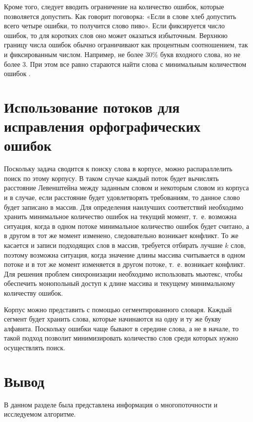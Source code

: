 Кроме того, следует вводить ограничение на количество ошибок, которые позволяется допустить. Как говорит поговорка: «Если в слове хлеб допустить всего четыре ошибки, то получится слово пиво». 
Если фиксируется число ошибок, то для коротких слов оно может оказаться избыточным.
Верхнюю границу числа ошибок обычно ограничивают как процентным соотношением, так и фиксированным числом. 
Например, не более $30\%$ букв входного слова, но не более 3.
При этом все равно стараются найти слова с минимальным количеством ошибок \cite{miem}.

\section{Использование потоков для исправления орфографических ошибок}

Поскольку задача сводится к поиску слова в корпусе, можно распараллелить поиск по этому корпусу. В таком случае каждый поток будет вычислять расстояние Левенштейна между заданным словом и некоторым словом из корпуса и в случае, если расстояние будет удовлетворять требованиям, то данное слово будет записано в массив. Для определения наилучших соответствий необходимо хранить минимальное количество ошибок на текущий момент, т.~е. возможна ситуация, когда в одном потоке минимальное количество ошибок будет считано, а в другом в тот же момент изменено, следовательно возникает конфликт. То же касается и записи подходящих слов в массив, требуется отбирать лучшие $k$ слов, поэтому возможна ситуация, когда значение длины массива считывается в одном потоке и в тот же момент изменяется в другом потоке, т.~е. возникает конфликт. Для решения проблем синхронизации необходимо использовать мьютекс, чтобы обеспечить монопольный доступ к длине массива и текущему минимальному количеству ошибок. 

Корпус можно представить с помощью сегментированного словаря. Каждый сегмент будет хранить слова, которые начинаются на одну и ту же букву алфавита. Поскольку ошибки чаще бывают в середине слова, а не в начале, то такой подход позволит минимизировать количество слов среди которых нужно осуществлять поиск.

\section*{Вывод} 
В данном разделе была представлена информация о многопоточности
и исследуемом алгоритме.